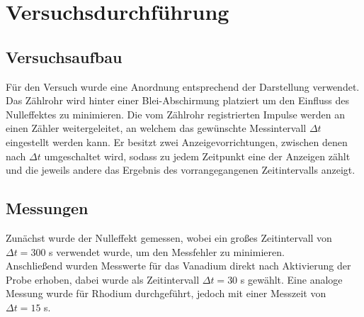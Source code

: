 \section{Versuchsdurchführung}
\label{sec:durchfuehrung}
\subsection{Versuchsaufbau}
\label{sec:aufbau}

Für den Versuch wurde eine Anordnung entsprechend der Darstellung verwendet. Das Zählrohr wird hinter einer 
Blei-Abschirmung platziert um den Einfluss des Nulleffektes zu minimieren. Die vom Zählrohr registrierten 
Impulse werden an einen Zähler weitergeleitet, an welchem das gewünschte Messintervall $\Delta t$ eingestellt 
werden kann. Er besitzt zwei Anzeigevorrichtungen, zwischen denen nach $\Delta t$ umgeschaltet wird, sodass 
zu jedem Zeitpunkt eine der Anzeigen zählt und die jeweils andere das Ergebnis des vorrangegangenen 
Zeitintervalls anzeigt.
\subsection{Messungen}
\label{sec:messungen}
Zunächst wurde der Nulleffekt gemessen, wobei ein großes Zeitintervall von $\Delta t=300$ s verwendet 
wurde, um den Messfehler zu minimieren. \\
Anschließend wurden Messwerte für das Vanadium direkt nach Aktivierung der Probe erhoben, dabei wurde 
als Zeitintervall $\Delta t=30$ s gewählt. Eine analoge Messung wurde für Rhodium durchgeführt, jedoch 
mit einer Messzeit von $\Delta t=15$ s.  